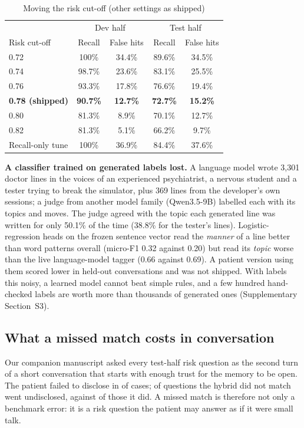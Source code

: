 \documentclass[sn-mathphys-num]{sn-jnl}
\begin{document}
\begin{table}[t]
\caption{Moving the risk cut-off (other settings as shipped)}
\label{tab:sweep}
\footnotesize
\begin{tabular*}{\linewidth}{@{\extracolsep{\fill}}lcccc@{}}
\toprule
& \multicolumn{2}{c}{Dev half} & \multicolumn{2}{c}{Test half}\\
Risk cut-off & Recall & False hits & Recall & False hits\\
\midrule
0.72 & 100\% & 34.4\% & 89.6\% & 34.5\%\\
0.74 & 98.7\% & 23.6\% & 83.1\% & 25.5\%\\
0.76 & 93.3\% & 17.8\% & 76.6\% & 19.4\%\\
\textbf{0.78 (shipped)} & \textbf{90.7\%} & \textbf{12.7\%} & \textbf{72.7\%} & \textbf{15.2\%}\\
0.80 & 81.3\% & 8.9\% & 70.1\% & 12.7\%\\
0.82 & 81.3\% & 5.1\% & 66.2\% & 9.7\%\\
\midrule
Recall-only tune & 100\% & 36.9\% & 84.4\% & 37.6\%\\
\bottomrule
\end{tabular*}
\end{table}

\textbf{A classifier trained on generated labels lost.} A language model wrote 3,301 doctor lines in the voices of an experienced psychiatrist, a
nervous student and a tester trying to break the simulator, plus 369 lines from the developer's own sessions; a judge from another model family
(Qwen3.5-9B) labelled each with its topics and moves. The judge agreed with the topic each generated line was written for only 50.1\% of the time
(38.8\% for the tester's lines). Logistic-regression heads on the frozen sentence vector read the \emph{manner} of a line better than word
patterns overall (micro-F1 0.32 against 0.20) but read its \emph{topic} worse than the live language-model tagger (0.66 against 0.69). A patient
version using them scored lower in held-out conversations and was not shipped. With labels this noisy, a learned model cannot beat simple rules,
and a few hundred hand-checked labels are worth more than thousands of generated ones (Supplementary Section~S3).

\subsection{What a missed match costs in conversation}
Our companion manuscript asked every test-half risk question as the second turn of a short conversation that starts with enough
trust for the memory to be open. The patient failed to disclose in \numRPmissVtwo{} of cases; \numRPmissNoRecVtwo{} of questions the hybrid did not
match went undisclosed, against \numRPmissRecVtwo{} of those it did. A missed match is therefore not only a benchmark error: it is a risk question
the patient may answer as if it were small talk.
\end{document}
